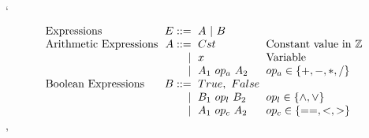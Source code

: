 `\[\arraycolsep=3pt
\begin{array}{lrll}
  \textnormal{Expressions} & E ::= & A ~|~ B & \textnormal{}\\
  

  \textnormal{Arithmetic Expressions} & A ::= & Cst & \textnormal{Constant value in $\mathbb{Z}$}\\
  & \mid & x & \textnormal{Variable} \\
  & \mid & A_1~op_a~A_2 & op_a \in \{ +, -, *, / \}\\
  
  
  
  \textnormal{Boolean Expressions} & B ::= & True,~ False & \textnormal{}\\
  & \mid & B_1~op_l~B_2 & op_l \in \{ \wedge , \vee \} \\
  & \mid & A_1~op_c~A_2 & op_c \in \{ ==, <, >\}\\ 
  
\end{array}
\]'